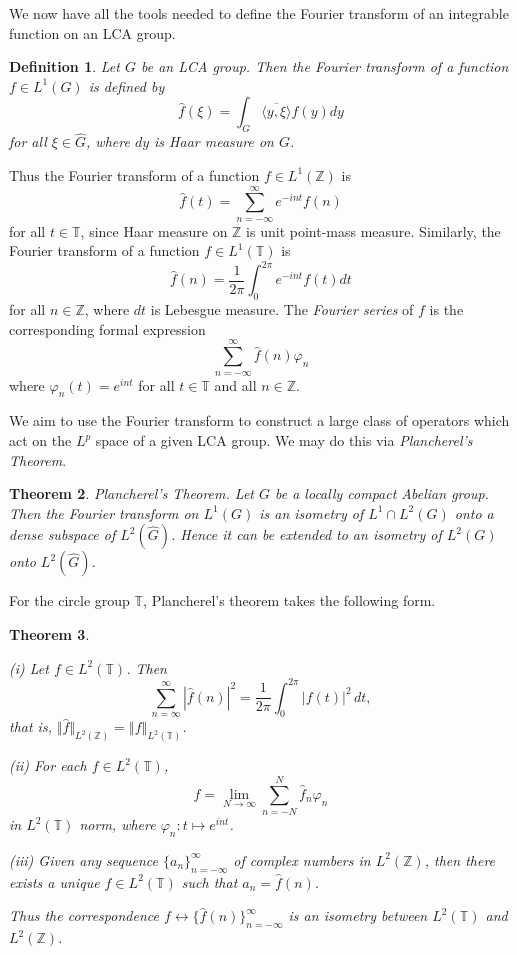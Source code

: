 \documentclass[12pt]{UNSWthesis}
\newcommand{\T}{\mathbb{T}}
\newcommand{\Z}{\mathbb{Z}}
\newcommand{\hatt}[1]{\widehat #1}
\def\ip<#1,#2>{\langle #1,#2 \rangle}
\def\norm#1{\left \Vert #1 \right \Vert}
\def\ssnorm#1{\Vert #1 \Vert}
\newtheorem{theorem}{Theorem}[section]
\newtheorem{definition}[theorem]{Definition}
\numberwithin{equation}{section}
\begin{document}
We now have all the tools needed to define the Fourier transform of an 
integrable
function on an LCA group.

\begin{definition}\label{Fourier transf}
Let $G$ be an LCA group. Then the {\em
Fourier transform} of a function $f\in L^1(G)$ is defined by
\[\hatt{f}(\xi) = \int_G \overline{\ip<y,\xi>}f(y)dy\]
for all $\xi\in\hatt{G}$, where $dy$ is Haar measure on $G$.
\end{definition}

Thus the Fourier transform of a function $f\in L^1(\Z)$ is
\[\hatt{f}(t)=\sum_{n=-\infty}^{\infty}e^{-int}f(n)\]
for all $t\in\T$, since Haar measure on $\Z$ is unit point-mass measure.
Similarly, the Fourier transform of a function $f\in L^1(\T)$ is
\[\hatt{f}(n) = \frac{1}{2\pi}\int_0^{2\pi}e^{-int}f(t)dt\]
for all $n\in\Z$, where $dt$ is Lebesgue measure. The {\em Fourier series} of
$f$ is the corresponding formal expression
\[\sum_{n=-\infty}^{\infty}\hatt{f}(n)\varphi_n\]
where $\varphi_n(t)=e^{int}$ for all $t\in\T$ and all $n\in\Z$.


We aim to use the Fourier transform to construct a large class of operators
which act on the $L^p$ space of a given LCA group. We may do this via {\em
Plancherel's Theorem}.

\begin{theorem}\label{isometry}\cite[Chapter VII, \S 4]{Katznelson}
{\em Plancherel's Theorem.} Let $G$ be a locally compact Abelian group. Then the
Fourier transform on $L^1(G)$ is an isometry of $L^1\cap L^2(G)$ onto a dense
subspace of $L^2(\hatt{G})$. Hence it can be extended to an isometry of $L^2(G)$
onto $L^2(\hatt{G})$.
\end{theorem}

For the circle group $\T$, Plancherel's theorem takes the following form.

\begin{theorem}\label{Plancherel for T}\cite[Theorem I.5.5]{Katznelson}

(i) Let $f\in L^2(\T)$. Then
\[\sum_{n=\infty}^{\infty}|\hatt{f}(n)|^2=
\frac{1}{2\pi}\int_0^{2\pi}|f(t)|^2\,dt,\]
that is, $\ssnorm{\hatt{f}}_{L^2(\Z)}=\norm{f}_{L^2(\T)}$.

(ii) For each $f\in L^2(\T)$,
\[f=\lim_{N\rightarrow\infty}\sum_{n=-N}^N\hatt{f}_n\varphi_n\]
in $L^2(\T)$ norm, where $\varphi_n:t\mapsto e^{int}$.

(iii) Given any sequence $\{a_n\}_{n=-\infty}^{\infty}$ of complex numbers in
$L^2(\Z)$, then there exists a unique $f\in L^2(\T)$ such that
$a_n=\hatt{f}(n)$.

Thus the correspondence $f\leftrightarrow\{\hatt{f}(n)\}_{n=-\infty}^{\infty}$
is an isometry between $L^2(\T)$ and $L^2(\Z)$.
\end{theorem}
\end{document}
